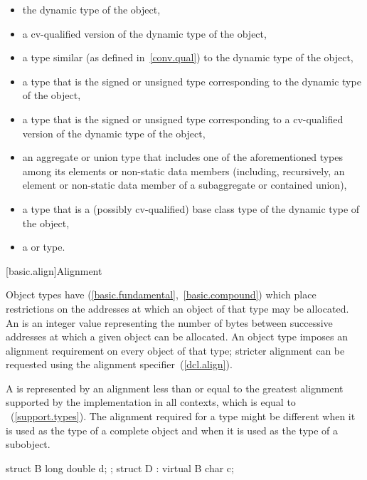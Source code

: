 \begin{itemize}
\item the dynamic type of the object,

\item a cv-qualified version of the dynamic type of the object,

\item a type similar (as defined in~\ref{conv.qual}) to the dynamic type
of the object,

\item a type that is the signed or unsigned type corresponding to the
dynamic type of the object,

\item a type that is the signed or unsigned type corresponding to a
cv-qualified version of the dynamic type of the object,

\item an aggregate or union type that includes one of the aforementioned types among its
elements or non-static data members (including, recursively, an element or non-static data member of a
subaggregate or contained union),

\item a type that is a (possibly cv-qualified) base class type of the dynamic type of
the object,

\item a  or   type.
\end{itemize}

[basic.align]{Alignment}

\pnum
{}%
Object types have  (\ref{basic.fundamental},~\ref{basic.compound})
which place restrictions on the addresses at which an object of that type
may be allocated. An  is an 
integer value representing the number of bytes between successive addresses
at which a given object can be allocated. An object type imposes an alignment
requirement on every object of that type; stricter alignment can be requested
using the alignment specifier~(\ref{dcl.align}).

\pnum
{}%
%
A  is represented by an alignment
less than or equal to the greatest alignment supported by the implementation in
all contexts, which is equal to
~(\ref{support.types}).
The alignment required for a type might be different when it is used as the type
of a complete object and when it is used as the type of a subobject. \enterexample
\begin{codeblock}
struct B { long double d; };
struct D : virtual B { char c; }
\end{codeblock}

